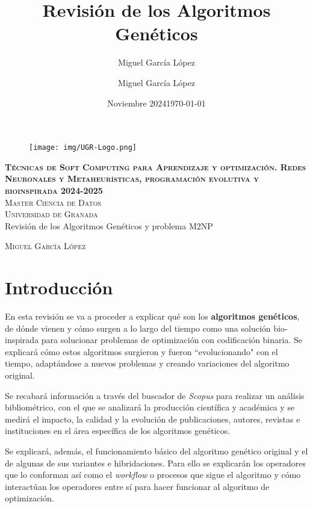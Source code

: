 \documentclass[12pt,letterpaper]{article}
\title{Revisión de los Algoritmos Genéticos}
\author{Miguel García López}
\date{Noviembre 2024}
\author{Miguel García López} %
\date{\normalsize\today} %
\begin{document}
\begin{titlepage}
    \begin{figure}
        \vspace{-1.3cm}
        \begin{center}
            \texttt{[image: img/UGR-Logo.png]}
        \end{center}
    \end{figure}
    \vspace{1.3cm}
    \centering
    \normalfont \normalsize
    \textsc{\textbf{Técnicas de Soft Computing para Aprendizaje y optimización. Redes Neuronales y Metaheurísticas, programación evolutiva y bioinspirada 2024-2025} \\ \vspace{.15cm} Master Ciencia de Datos\\ \vspace{.15cm} Universidad de Granada} \\ [25pt]
    \huge Revisión de los Algoritmos Genéticos y problema M2NP

    \normalfont \normalsize \vspace{.30cm}
    \textsc{Miguel García López}

\end{titlepage}

\tableofcontents
\listoffigures
\newpage

\section{Introducción}
En esta revisión se va a proceder a explicar qué son los \textbf{algoritmos genéticos}, de dónde vienen y cómo surgen a lo largo del tiempo como una solución bio-inspirada para solucionar problemas de optimización con codificación binaria. Se explicará cómo estos algoritmos surgieron y fueron ``evolucionando" con el tiempo, adaptándose a nuevos problemas y creando variaciones del algoritmo original.

Se recabará información a través del buscador de \textit{Scopus} para realizar un análisis bibliométrico, con el que se analizará la producción científica y académica y se medirá el impacto, la calidad y la evolución de publicaciones, autores, revistas e instituciones en el área específica de los algoritmos genéticos.

Se explicará, además, el funcionamiento básico del algoritmo genético original y el de algunas de sus variantes e hibridaciones. Para ello se explicarán los operadores que lo conforman así como el \textit{workflow} o procesos que sigue el algoritmo y cómo interactúan los operadores entre sí para hacer funcionar al algoritmo de optimización.
\end{document}
